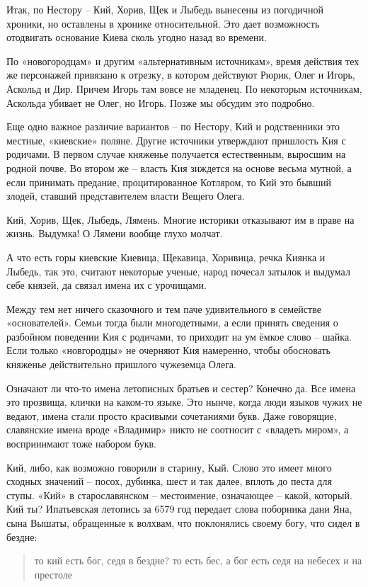 Итак, по Нестору – Кий, Хорив, Щек и Лыбедь вынесены из погодичной хроники, но оставлены в хронике относительной. Это дает возможность отодвигать основание Киева сколь угодно назад во времени.

По «новогородцам» и другим «альтернативным источникам», время действия тех же персонажей привязано к отрезку, в котором действуют Рюрик, Олег и Игорь, Аскольд и Дир. Причем Игорь там вовсе не младенец. По некоторым источникам, Аскольда убивает не Олег, но Игорь. Позже мы обсудим это подробно.

Еще одно важное различие вариантов – по Нестору, Кий и родственники это местные, «киевские» поляне. Другие источники утверждают пришлость Кия с родичами. В первом случае княженье получается естественным, выросшим на родной почве. Во втором же – власть Кия зиждется на основе весьма мутной, а если принимать предание, процитированное Котляром, то Кий это бывший злодей, ставший представителем власти Вещего Олега.

Кий, Хорив, Щек, Лыбедь, Лямень. Многие историки отказывают им в праве на жизнь. Выдумка! О Лямени вообще глухо молчат.  

А что есть горы киевские Киевица, Щекавица, Хоривица, речка Киянка и Лыбедь, так это, считают некоторые ученые, народ почесал затылок и выдумал себе князей, да связал имена их с урочищами.

Между тем нет ничего сказочного и тем паче удивительного в семействе «основателей». Семьи тогда были многодетными, а если принять сведения о разбойном поведении Кия с родичами, то приходит на ум ёмкое слово – шайка. Если только «новгородцы» не очерняют Кия намеренно, чтобы обосновать княженье действительно пришлого чужеземца Олега.

Означают ли что-то имена летописных братьев и сестер? Конечно да. Все имена это прозвища, клички на каком-то языке. Это нынче, когда люди языков чужих не ведают, имена стали просто красивыми сочетаниями букв. Даже говорящие, славянские имена вроде «Владимир» никто не соотносит с «владеть миром», а воспринимают тоже набором букв.

Кий, либо, как возможно говорили в старину, Кый. Слово это имеет много сходных значений – посох, дубинка, шест и так далее, вплоть до песта для ступы. «Кий» в старославянском – местоимение, означающее – какой, который. Кий ты? Ипатьевская летопись за 6579 год передает слова поборника дани Яна, сына Вышаты, обращенные к волхвам, что поклонялись своему богу, что сидел в бездне:

\begin{quotation}
то кий есть бог, седя в бездне? то есть бес, а бог есть седя на небесех и на престоле
\end{quotation}

